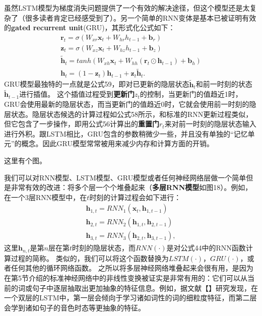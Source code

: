 \documentclass[10pt,a4paper]{ctexart}
\begin{document}
虽然LSTM模型为梯度消失问题提供了一个有效的解决途径，但这个模型还是太复杂了（很多读者肯定已经感受到了）。另一个简单的RNN变体是基本已被证明有效的\textbf{gated recurrent unit}(GRU)，其形式化公式如下：
\[
 \begin{array}{l}
 \textbf{r}_t = \sigma (W_{xr}\textbf{x}_t + W_{hr}h_{t-1} + \textbf{b}_r) \\
 \textbf{z}_t = \sigma (W_{xz}\textbf{x}_t + W_{hz}h_{t-1} + \textbf{b}_z) \\
 \tilde{\textbf{h}}_t = tanh(W_{xh}\textbf{x}_t + W_{hh}(\textbf{r}_t \odot \textbf{h}_{t-1}) + \textbf{b}_h) \\
 \textbf{h}_t = (1 - \textbf{z}_t)\textbf{h}_{t-1} + \textbf{z}_t \tilde{\textbf{h}}_t.
 \end{array}
\]
GRU模型最独特的一点就是公式59，即对已更新的隐层状态$\tilde{\textbf{h}}_t$和前一时刻的状态$\tilde{\textbf{h}}_{t-1}$进行插值。
这个插值过程受到\textbf{更新门$z_t$}的控制，当更新门的值趋近1时，GRU会使用最新的隐层状态，而当更新门的值趋近0时，它就会使用前一时刻的隐层状态。隐层状态候选的计算过程如公式58所示，和标准的RNN更新过程类似，但它包含了一步操作，即用公式56计算出的\textbf{重置门$r_t$}来对前一时刻的隐层状态输入进行外积。跟LSTM相比，GRU包含的参数稍微少一些，并且没有单独的“记忆单元”的概念。因此GRU模型常常被用来减少内存和计算方面的开销。

这里有个图。

我们可以对RNN模型、LSTM模型、GRU模型或者任何神经网络层做一个简单但是非常有效的改进：将多个层一个个堆叠起来（\textbf{多层RNN模型}如图18）。例如，在一个3层RNN模型中，在$t$时刻的计算过程会如下进行：
\[
 \begin{array}{l}
 \textbf{h}_{1,t} = RNN_1 (\textbf{x}_t,\textbf{h}_{1,t-1}) \\
 \textbf{h}_{2,t} = RNN_2 (\textbf{h}_{1,t},\textbf{h}_{2,t-1}) \\
 \textbf{h}_{3,t} = RNN_3 (\textbf{h}_{2,t},\textbf{h}_{3,t-1}),
 \end{array}
\]
这里$\textbf{h}_{n,t}$是第$n$层在第$t$时刻的隐层状态，而$RNN(\cdot)$是对公式44中的RNN函数计算过程的简称。
类似的，我们可以将这个函数替换为$LSTM(\cdot)$，$GRU(\cdot)$，或者任何其他的循环网络函数。
之所以将多层神经网络堆叠起来会很有用，是因为在第5节介绍的标准神经网络中的非线性变换被证实是非常有用的：它们可以从当前的词或句子中逐层抽取出更加抽象的特征信息。例如，据文献【】研究发现，在一个双层的LSTM中，第一层会倾向于学习诸如词性的词的细粒度特征，而第二层会学到诸如句子的音色时态等更抽象的特征。
\end{document}
